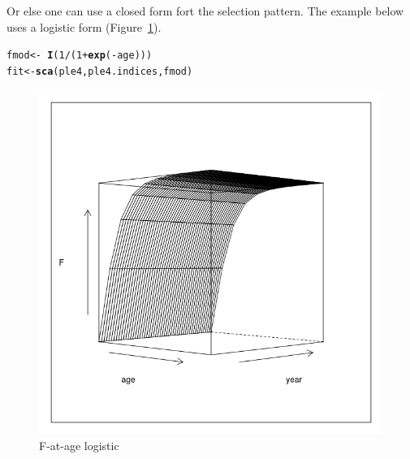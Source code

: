 \documentclass[a4paper,english,10pt]{article}\usepackage[]{graphicx}\usepackage[]{color}
\makeatletter
\def\maxwidth{ %
  \ifdim\Gin@nat@width>\linewidth
    \linewidth
  \else
    \Gin@nat@width
  \fi
}
\newcommand{\hlnum}[1]{\textcolor[rgb]{0.686,0.059,0.569}{#1}}%
\newcommand{\hlopt}[1]{\textcolor[rgb]{0,0,0}{#1}}%
\newcommand{\hlstd}[1]{\textcolor[rgb]{0.345,0.345,0.345}{#1}}%
\newcommand{\hlkwb}[1]{\textcolor[rgb]{0.69,0.353,0.396}{#1}}%
\newcommand{\hlkwd}[1]{\textcolor[rgb]{0.737,0.353,0.396}{\textbf{#1}}}%
\newenvironment{kframe}{%
 \def\at@end@of@kframe{}%
 \ifinner\ifhmode%
  \def\at@end@of@kframe{\end{minipage}}%
  \begin{minipage}{\columnwidth}%
 \fi\fi%
 \def\FrameCommand##1{\hskip\@totalleftmargin \hskip-\fboxsep
 \colorbox{shadecolor}{##1}\hskip-\fboxsep
     \hskip-\linewidth \hskip-\@totalleftmargin \hskip\columnwidth}%
 \MakeFramed {\advance\hsize-\width
   \@totalleftmargin\z@ \linewidth\hsize
   \@setminipage}}%
 {\par\unskip\endMakeFramed%
 \at@end@of@kframe}
\newenvironment{knitrout}{}{} %
\makeatother
\begin{document}
Or else one can use a closed form fort the selection pattern. The example below uses a logistic form (Figure~\ref{fig:logistic}).

\begin{knitrout}
\color{fgcolor}\begin{kframe}
\begin{alltt}
\hlstd{fmod} \hlkwb{<-} \hlopt{~}\hlkwd{I}\hlstd{(}\hlnum{1}\hlopt{/}\hlstd{(}\hlnum{1} \hlopt{+} \hlkwd{exp}\hlstd{(}\hlopt{-}\hlstd{age)))}
\hlstd{fit} \hlkwb{<-} \hlkwd{sca}\hlstd{(ple4, ple4.indices, fmod)}
\end{alltt}
\end{kframe}
\end{knitrout}

\begin{knitrout}
\color{fgcolor}\begin{figure}[H]

{\centering \includegraphics[width=\maxwidth]{figure/logistic-1} 

}

\caption[F-at-age logistic]{F-at-age logistic}\label{fig:logistic}
\end{figure}


\end{knitrout}
\end{document}

